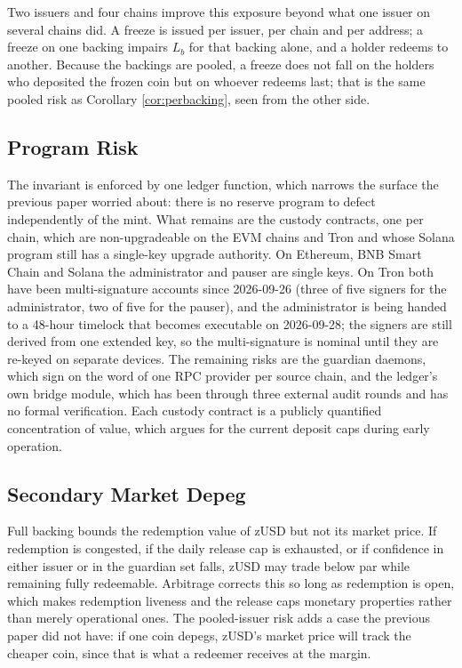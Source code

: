 \documentclass[11pt,a4paper]{article}
\begin{document}
Two issuers and four chains improve this exposure beyond what one issuer on several chains did. A freeze is issued per issuer, per chain and per address; a freeze on one backing impairs $L_b$ for that backing alone, and a holder redeems to another. Because the backings are pooled, a freeze does not fall on the holders who deposited the frozen coin but on whoever redeems last; that is the same pooled risk as Corollary \ref{cor:perbacking}, seen from the other side.

\subsection{Program Risk}

The invariant is enforced by one ledger function, which narrows the surface the previous paper worried about: there is no reserve program to defect independently of the mint. What remains are the custody contracts, one per chain, which are non-upgradeable on the EVM chains and Tron and whose Solana program still has a single-key upgrade authority. On Ethereum, BNB Smart Chain and Solana the administrator and pauser are single keys. On Tron both have been multi-signature accounts since 2026-09-26 (three of five signers for the administrator, two of five for the pauser), and the administrator is being handed to a 48-hour timelock that becomes executable on 2026-09-28; the signers are still derived from one extended key, so the multi-signature is nominal until they are re-keyed on separate devices. The remaining risks are the guardian daemons, which sign on the word of one RPC provider per source chain, and the ledger's own bridge module, which has been through three external audit rounds and has no formal verification. Each custody contract is a publicly quantified concentration of value, which argues for the current deposit caps during early operation.

\subsection{Secondary Market Depeg}

Full backing bounds the redemption value of zUSD but not its market price. If redemption is congested, if the daily release cap is exhausted, or if confidence in either issuer or in the guardian set falls, zUSD may trade below par while remaining fully redeemable. Arbitrage corrects this so long as redemption is open, which makes redemption liveness and the release caps monetary properties rather than merely operational ones. The pooled-issuer risk adds a case the previous paper did not have: if one coin depegs, zUSD's market price will track the cheaper coin, since that is what a redeemer receives at the margin.
\end{document}
